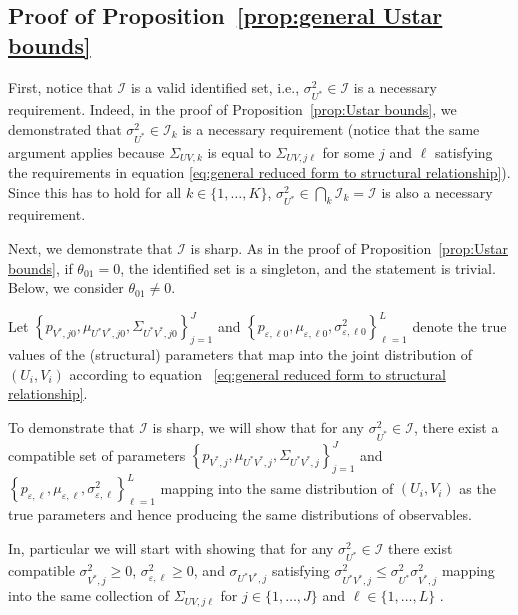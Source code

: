 \documentclass[12pt]{article}
\begin{document}
\begin{appendices}
\bigskip

\subsection{Proof of Proposition~\protect\ref{prop:general Ustar bounds}}

First, notice that $\mathcal{I}$ is a valid identified set, i.e., $%
\sigma_{U^*}^2 \in \mathcal{I}$ is a necessary requirement. Indeed, in the
proof of Proposition~\ref{prop:Ustar bounds}, we demonstrated that $%
\sigma_{U^*}^2 \in \mathcal{I}_{k}$ is a necessary requirement (notice that
the same argument applies because $\Sigma_{UV,k}$ is equal to $\Sigma_{UV,j
\ell}$ for some $j$ and $\ell$ satisfying the requirements in equation %
\eqref{eq:general reduced form to structural relationship}). Since this has
to hold for all $k \in \{1, \ldots, K\}$, $\sigma_{U^*}^2 \in \bigcap_{k} 
\mathcal{I}_{k} = \mathcal{I} $ is also a necessary requirement.

Next, we demonstrate that $\mathcal{I}$ is sharp. As in the proof of
Proposition~\ref{prop:Ustar bounds}, if $\theta _{01}=0$, the identified set
is a singleton, and the statement is trivial. Below, we consider $\theta
_{01}\neq 0$.

Let $\left\{ p_{V^*,j0},\mu _{U^{\ast } V^*,j0},\Sigma _{U^{\ast
}V^*,j0}\right\} _{j=1}^{J}$ and $\left\{ p_{\varepsilon, \ell 0},\mu
_{\varepsilon ,\ell 0},\sigma _{\varepsilon ,\ell 0}^{2}\right\} _{\ell
=1}^{L}$ denote the true values of the (structural) parameters that map into
the joint distribution of $(U_i,V_i)$ according to equation~%
\eqref{eq:general reduced
form to structural relationship}.

To demonstrate that $\mathcal{I}$ is sharp, we will show that for any $%
\sigma _{U^{\ast }}^{2}\in \mathcal{I}$, there exist a compatible set of
parameters $\left\{ p_{V^*,j},\mu _{U^{\ast } V^*,j},\Sigma _{U^{\ast
}V^*,j}\right\} _{j=1}^{J}$ and $\left\{ p_{\varepsilon, \ell},\mu
_{\varepsilon ,\ell},\sigma _{\varepsilon ,\ell}^{2}\right\} _{\ell =1}^{L}$
mapping into the same distribution of $(U_i,V_i)$ as the true parameters and
hence producing the same distributions of observables.

In, particular we will start with showing that for any $\sigma _{U^{\ast
}}^{2}\in \mathcal{I}$ there exist compatible $\sigma _{V^{\ast },j}^{2}\geq
0$, $\sigma _{\varepsilon ,\ell }^{2}\geq 0$, and $\sigma _{U^{\ast }V^{\ast
},j}$ satisfying $\sigma _{U^{\ast }V^{\ast },j}^{2}\leq \sigma _{U^{\ast
}}^{2}\sigma _{V^{\ast },j}^{2}$ mapping into the same collection of $%
\Sigma_{UV,j \ell}$ for $j\in \{1,\ldots ,J\}$ and $\ell \in \{1,\ldots ,L\}$%
.


\end{appendices}
\end{document}
